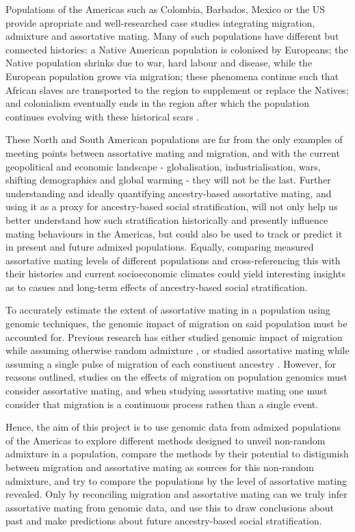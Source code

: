 \documentclass[11pt]{article}
\begin{document}
Populations of the Americas such as Colombia, Barbados, Mexico or the US provide apropriate and well-researched case studies integrating migration, admixture and assortative mating. Many of such populations have different but connected histories: a Native American population is colonised by Europeans; the Native population shrinks due to war, hard labour and disease, while the European population grows via migration; these phenomena continue such that African slaves are transported to the region to supplement or replace the Natives; and colonialism eventually ends in the region after which the population continues evolving with these historical scars \parencite{Bryc2010,Mas-Sandoval2019,ESilva2020}. 

These North and South American populations are far from the only examples of meeting points between assortative mating and migration, and with the current geopolitical and economic landscape - globalisation, industrialisation, wars, shifting demographics and global warming - they will not be the last. Further understanding and ideally quantifying ancestry-based assortative mating, and using it as a proxy for ancestry-based social stratification, will not only help us better understand how such stratification historically and presently influence mating behaviours in the Americas, but could also be used to track or predict it in present and future admixed populations. Equally, comparing measured assortative mating levels of different populations and cross-referencing this with their histories and current socioeconomic climates could yield interesting insights as to casues and long-term effects of ancestry-based social stratification.

To accurately estimate the extent of assortative mating in a population using genomic techniques, the genomic impact of migration on said population must be accounted for. Previous research has either studied genomic impact of migration while assuming otherwise random admixture \parencite{Norris2020,Borda2020,Gravel2012}, or studied assortative mating while assuming a single pulse of migration of each constiuent ancestry \parencite{Norris2019,Risch2009,Zaitlen2017}. However, for reasons outlined, studies on the effects of migration on population genomics must consider assortative mating, and when studying assortative mating one must consider that migration is a continuous process rathen than a single event.

Hence, the aim of this project is to use genomic data from admixed populations of the Americas to explore different methods designed to unveil non-random admixture in a population, compare the methods by their potential to distigunish between migration and assortative mating as sources for this non-random admixture, and try to compare the populations by the level of assortative mating revealed. Only by reconciling migration and assortative mating can we truly infer assortative mating from genomic data, and use this to draw conclusions about past and make predictions about future ancestry-based social stratification.
\end{document}
